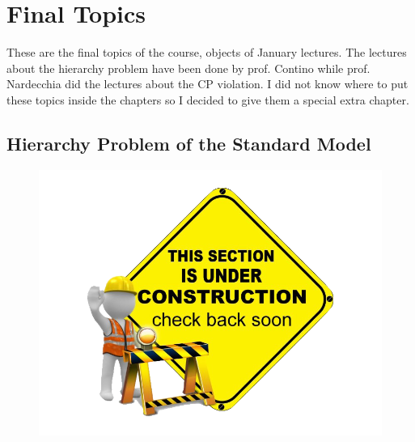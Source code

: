 \documentclass[../main.tex]{subfiles}
\begin{document}
\setchapterpreamble[u]{\margintoc}
\chapter[Final Topics]{Final Topics\footnotemark[0]}
These are the final topics of the course, objects of January lectures. The lectures about the hierarchy problem have been done by prof. Contino while prof. Nardecchia did the lectures about the CP violation. I did not know where to put these topics inside the chapters so I decided to give them a special extra chapter.
\section{Hierarchy Problem of the Standard Model}
\begin{figure}[h]
    \centering
    \includegraphics{Images/workinprogress.png}
    \caption*{}
    \label{fig:my_label}
\end{figure}
\newpage
\end{document}
